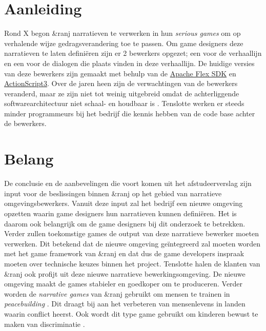\documentclass{report}
\newcommand{\organisation}{\&ranj }
\begin{document}
\section{Aanleiding}

Rond X begon \organisation narratieven te verwerken in hun \emph{serious games} om op verhalende wijze gedragsverandering toe te passen. Om game designers deze narratieven te laten defini{\"e}ren zijn er 2 bewerkers opgezet; een voor de verhaallijn en een voor de dialogen die plaats vinden in deze verhaallijn. De huidige versies van deze bewerkers zijn gemaakt met behulp van de \href{https://en.wikipedia.org/wiki/Apache_Flex}{Apache Flex SDK} en \href{http://www.adobe.com/devnet/actionscript/articles/actionscript3_overview.html}{ActionScript3}.
Over de jaren heen zijn de verwachtingen van de bewerkers veranderd, maar ze zijn niet tot weinig uitgebreid omdat de achterliggende softwarearchitectuur niet schaal- en houdbaar is \cite{interviewivo}. Tenslotte werken er steeds minder programmeurs bij het bedrijf die kennis hebben van de code base achter de bewerkers.

\section{Belang}
De conclusie en de aanbevelingen die voort komen uit het afstudeerverslag zijn input voor de beslissingen binnen \organisation op het gebied van narratieve omgevingsbewerkers. Vanuit deze input zal het bedrijf een nieuwe omgeving opzetten waarin game designers hun narratieven kunnen defini{\"e}ren. Het is daarom ook belangrijk om de game designers bij dit onderzoek te betrekken. Verder zullen toekomstige games de output van deze narratieve bewerker moeten verwerken. Dit betekend dat de nieuwe omgeving ge{\"i}ntegreerd zal moeten worden met het game framework van \organisation en dat dus de game developers inspraak moeten over technische keuzes binnen het project. Tenslotte halen de klanten van \organisation ook profijt uit deze nieuwe narratieve bewerkingsomgeving. De nieuwe omgeving maakt de games stabieler en goedkoper om te produceren.
Verder worden de \emph{narrative games} van \organisation gebruikt om mensen te trainen in \emph{peacebuilding} \cite{missionzhobiaorg}. Dit draagt bij aan het verbeteren van mensenlevens in landen waarin conflict heerst. 
Ook wordt dit type game gebruikt om kinderen bewust te maken van discriminatie \cite{fairplay}.
\end{document}
